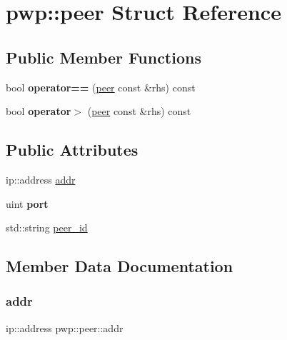 \hypertarget{structpwp_1_1peer}{}\section{pwp\+:\+:peer Struct Reference}
\label{structpwp_1_1peer}
\subsection*{Public Member Functions}
\begin{DoxyCompactItemize}
\item 
\mbox{\label{structpwp_1_1peer_a63214c33b38e8ac1b1b8a23f724a0682}} 
bool {\bfseries operator==} (\hyperlink{structpwp_1_1peer}{peer} const \&rhs) const
\item 
\mbox{\label{structpwp_1_1peer_a41fbc7e5f9d84a47224c61bd2b5ca9a3}} 
bool {\bfseries operator$>$} (\hyperlink{structpwp_1_1peer}{peer} const \&rhs) const
\end{DoxyCompactItemize}
\subsection*{Public Attributes}
\begin{DoxyCompactItemize}
\item 
ip\+::address \hyperlink{structpwp_1_1peer_a862dc1b14fd2e8485cc4c080bbe74e99}{addr}
\item 
\mbox{\label{structpwp_1_1peer_accc9b1eb439425e9b944ed6ca966c8a4}} 
uint {\bfseries port}
\item 
std\+::string \hyperlink{structpwp_1_1peer_a93c9dfe3e8766d364887f615d0880777}{peer\+\_\+id}
\end{DoxyCompactItemize}


\subsection{Member Data Documentation}
\mbox{\label{structpwp_1_1peer_a862dc1b14fd2e8485cc4c080bbe74e99}} 
\subsubsection{\texorpdfstring{addr}{addr}}
{\footnotesize\ttfamily ip\+::address pwp\+::peer\+::addr}

